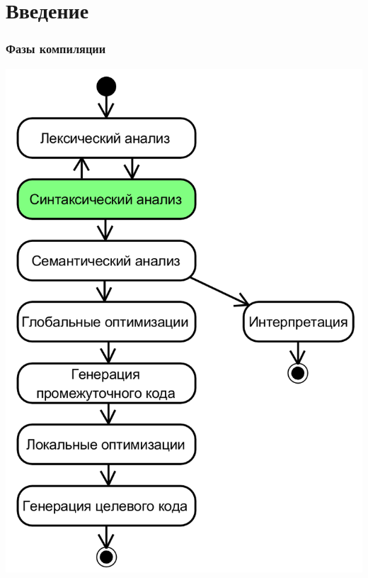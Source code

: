 \documentclass{../../slides-style}
\begin{document}
    
    \begin{frame}[plain]
        \titlepage
    \end{frame}

    \section{Введение}

    \begin{frame}
        \frametitle{Фазы компиляции}
        \begin{center}
            \includegraphics[height=0.8\textheight]{compilerPhases.png}
        \end{center}
    \end{frame}
\end{document}
